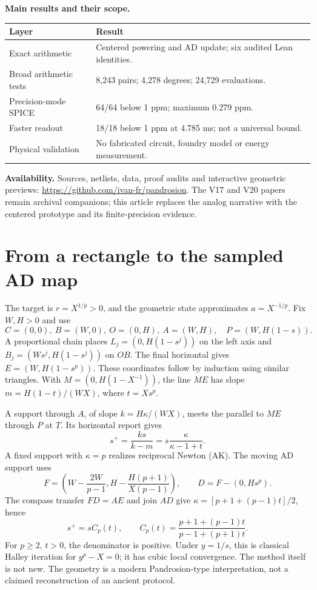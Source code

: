 \documentclass[11pt,a4paper]{article}
\newcommand{\repo}{\url{https://github.com/ivan-fr/pandrosion}}
\begin{document}
\textbf{Main results and their scope.}
\begin{center}\small
\begin{tabularx}{\linewidth}{@{}lX@{}}\toprule
Layer & Result \\ \midrule
Exact arithmetic & Centered powering and AD update; six audited Lean identities.\\
Broad arithmetic tests & 8,243 pairs; 4,278 degrees; 24,729 evaluations.\\
Precision-mode SPICE & 64/64 below 1 ppm; maximum 0.279 ppm.\\
Faster readout & 18/18 below 1 ppm at 4.785 ms; not a universal bound.\\
Physical validation & No fabricated circuit, foundry model or energy measurement.\\\bottomrule
\end{tabularx}\end{center}
\textbf{Availability.} Sources, netlists, data, proof audits and interactive geometric previews: \repo. The V17 and V20 papers remain archival companions; this article replaces the analog narrative with the centered prototype and its finite-precision evidence.
\clearpage

\section{From a rectangle to the sampled AD map}
The target is $r=X^{1/p}>0$, and the geometric state approximates $a=X^{-1/p}$. Fix $W,H>0$ and use
\[
 C=(0,0),\ B=(W,0),\ O=(0,H),\ A=(W,H),\quad
 P=(W,H(1-s)).
\]
A proportional chain places $L_j=(0,H(1-s^j))$ on the left axis and $B_j=(Ws^j,H(1-s^j))$ on $OB$. The final horizontal gives $E=(W,H(1-s^p))$. These coordinates follow by induction using similar triangles. With $M=(0,H(1-X^{-1}))$, the line $ME$ has slope $m=H(1-t)/(WX)$, where $t=Xs^p$.

A support through $A$, of slope $k=H\kappa/(WX)$, meets the parallel to $ME$ through $P$ at $T$. Its horizontal report gives
\begin{equation}
 s^+=\frac{ks}{k-m}=s\frac{\kappa}{\kappa-1+t}.\label{eq:geometry}
\end{equation}
A fixed support with $\kappa=p$ realizes reciprocal Newton (AK). The moving AD support uses
\[
 F=\left(W-\frac{2W}{p-1},H-\frac{H(p+1)}{X(p-1)}\right),\qquad
 D=F-(0,Hs^p).
\]
The compass transfer $FD=AE$ and join $AD$ give $\kappa=[p+1+(p-1)t]/2$, hence
\begin{equation}
 s^+=sC_p(t),\qquad C_p(t)=\frac{p+1+(p-1)t}{p-1+(p+1)t}.\label{eq:ad}
\end{equation}
For $p\ge2$, $t>0$, the denominator is positive. Under $y=1/s$, this is classical Halley iteration for $y^p-X=0$; it has cubic local convergence. The method itself is not new. The geometry is a modern Pandrosion-type interpretation, not a claimed reconstruction of an ancient protocol.
\end{document}
